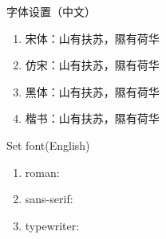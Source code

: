 \documentclass[dvipsnames, svgnames,a4paper,11pt]{article}
\begin{document}
\begin{tbox}{字体设置（中文）}
\begin{enumerate}
	\item 宋体：{\songti 山有扶苏，隰有荷华}
	\item 仿宋：{\fangsong 山有扶苏，隰有荷华}
	\item 黑体：{\heiti 山有扶苏，隰有荷华}
	\item 楷书：{\kaishu 山有扶苏，隰有荷华}
\end{enumerate}
\end{tbox}

\begin{tbox}{Set font(English)}
\begin{enumerate}
	\item roman:
	\item sans-serif:
	\item typewriter:
\end{enumerate}
\end{tbox}
\end{document}
